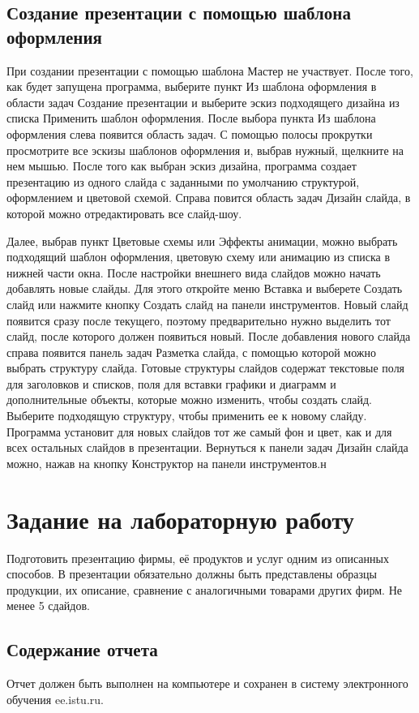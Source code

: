 \documentclass[a4paper]{article}
\begin{document}
\subsection{Создание презентации с помощью шаблона оформления}
При создании презентации с помощью шаблона Мастер не участвует. После того, как будет запущена программа, выберите пункт Из шаблона оформления в области задач Создание презентации и выберите эскиз подходящего дизайна из списка Применить шаблон оформления. После выбора пункта Из шаблона оформления слева появится область задач. С помощью полосы прокрутки просмотрите все эскизы шаблонов оформления и, выбрав нужный, щелкните на нем мышью. После того как выбран эскиз дизайна, программа создает презентацию из одного слайда с заданными по умолчанию структурой, оформлением и цветовой схемой. Справа повится область задач Дизайн слайда, в которой можно отредактировать все слайд-шоу.

Далее, выбрав пункт Цветовые схемы или Эффекты анимации, можно выбрать подходящий шаблон оформления, цветовую схему или анимацию из списка в нижней части окна. После настройки внешнего вида слайдов можно начать добавлять новые слайды. Для этого откройте меню Вставка и выберете Создать слайд или нажмите кнопку Создать слайд на панели инструментов. Новый слайд появится сразу после текущего, поэтому предварительно нужно выделить тот слайд, после которого должен появиться новый. После добавления нового слайда справа появится панель задач Разметка слайда, с помощью которой можно выбрать структуру слайда. Готовые структуры слайдов содержат текстовые поля для заголовков и списков, поля для вставки графики и диаграмм и дополнительные объекты, которые можно изменить, чтобы создать слайд. Выберите подходящую структуру, чтобы применить ее к новому слайду. Программа установит для новых слайдов тот же самый фон и цвет, как и для всех остальных слайдов в презентации. Вернуться к панели задач Дизайн слайда можно, нажав на кнопку Конструктор на панели инструментов.н

\section{Задание на лабораторную работу}

Подготовить презентацию фирмы, её продуктов и услуг одним из описанных способов. В презентации обязательно должны быть представлены образцы продукции, их описание, сравнение с аналогичными товарами других фирм. Не менее 5 сдайдов.

\subsection{Содержание отчета}
Отчет должен быть выполнен на компьютере и сохранен в систему электронного обучения ee.istu.ru.
\end{document}
